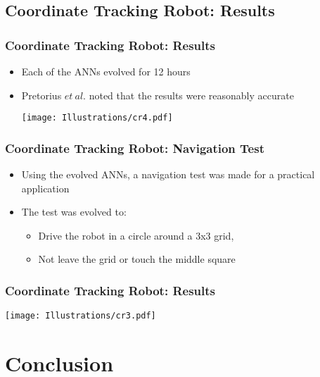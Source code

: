 \documentclass{beamer}
\begin{document}
\subsection*{Coordinate Tracking Robot: Results}
\begin{frame}
  \frametitle{Coordinate Tracking Robot: Results}
 \begin{itemize}
 \item Each of the ANNs evolved for 12 hours
 \item Pretorius $et~al.$ noted that the results were reasonably accurate
\begin{center}
 \texttt{[image: Illustrations/cr4.pdf]}
       \\
\end{center}
\end{itemize}
\end{frame}

\begin{frame}
\frametitle{Coordinate Tracking Robot: Navigation Test}
\begin{itemize}
\item Using the evolved ANNs, a navigation test was made for a practical application
\item The test was evolved to:
\begin{itemize}
\item Drive the robot in a circle around a 3x3 grid,
\item Not leave the grid or touch the middle square
\end{itemize}
\end{itemize}
\end{frame}

\begin{frame}
  \frametitle{Coordinate Tracking Robot: Results}
\begin{center}
 \texttt{[image: Illustrations/cr3.pdf]}
       \\
\end{center}
\end{frame}

\section{Conclusion}
\end{document}
